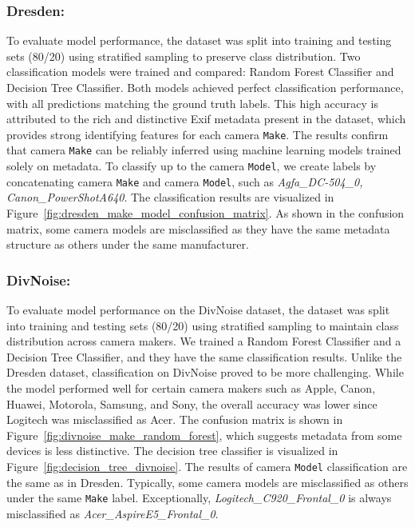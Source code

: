 \subsubsection{Dresden:}
To evaluate model performance, the dataset was split into training and testing sets (80/20) using stratified sampling to preserve class distribution. Two classification models were trained and compared: Random Forest Classifier and Decision Tree Classifier. Both models achieved perfect classification performance, with all predictions matching the ground truth labels. 
This high accuracy is attributed to the rich and distinctive Exif metadata present in the dataset, which provides strong identifying features for each camera \texttt{Make}. The results confirm that camera \texttt{Make} can be reliably inferred using machine learning models trained solely on metadata. To classify up to the camera \texttt{Model}, we create labels by concatenating camera \texttt{Make} and camera \texttt{Model}, such as \textit{Agfa\_DC-504\_0, Canon\_PowerShotA640}. The classification results are visualized in Figure~\ref{fig:dresden_make_model_confusion_matrix}. As shown in the confusion matrix, some camera models are misclassified as they have the same metadata structure as others under the same manufacturer.

\subsubsection{DivNoise:}

To evaluate model performance on the DivNoise dataset, the dataset was split into training and testing sets (80/20) using stratified sampling to maintain class distribution across camera makers.
We trained a Random Forest Classifier and a Decision Tree Classifier, and they have the same classification results. Unlike the Dresden dataset, classification on DivNoise proved to be more challenging. While the model performed well for certain camera makers such as Apple, Canon, Huawei, Motorola, Samsung, and Sony, the overall accuracy was lower since Logitech was misclassified as Acer.
The confusion matrix is shown in Figure~\ref{fig:divnoise_make_random_forest}, which suggests metadata from some devices is less distinctive. The decision tree classifier is visualized in Figure~\ref{fig:decision_tree_divnoise}.
The results of camera \texttt{Model} classification are the same as in Dresden. Typically, some camera models are misclassified as others under the same \texttt{Make} label. Exceptionally, \textit{Logitech\_C920\_Frontal\_0} is always misclassified as \textit{Acer\_AspireE5\_Frontal\_0}.


